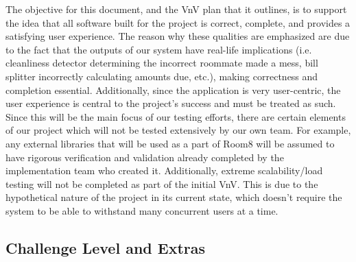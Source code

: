 \documentclass[12pt, titlepage]{article}
\begin{document}


The objective for this document, and the VnV plan that it outlines, is to support the idea that all software built for the project is correct, complete, and provides a satisfying user experience. The reason why these qualities are emphasized are due to the fact that the outputs of our system have real-life implications (i.e. cleanliness detector determining the incorrect roommate made a mess, bill splitter incorrectly calculating amounts due, etc.), making correctness and completion essential. Additionally, since the application is very user-centric, the user experience is central to the project's success and must be treated as such. Since this will be the main focus of our testing efforts, there are certain elements of our project which will not be tested extensively by our own team. For example, any external libraries that will be used as a part of Room8 will be assumed to have rigorous verification and validation already completed by the implementation team who created it. Additionally, extreme scalability/load testing will not be completed as part of the initial VnV. This is due to the hypothetical nature of the project in its current state, which doesn't require the system to be able to withstand many concurrent users at a time. 

\subsection{Challenge Level and Extras}

\end{document}
